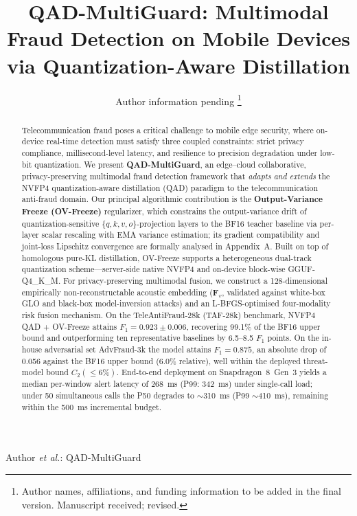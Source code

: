 \documentclass[lettersize,journal]{IEEEtran}
\begin{document}
\title{QAD-MultiGuard: Multimodal Fraud Detection on Mobile Devices\\
via Quantization-Aware Distillation}

\author{%
  Author information pending%
  \thanks{Author names, affiliations, and funding information to be
    added in the final version.  Manuscript received; revised.}%
}

%
{Author \MakeLowercase{\textit{et al.}}: QAD-MultiGuard}

\maketitle

\begin{abstract}
Telecommunication fraud poses a critical challenge to mobile edge
security, where on-device real-time detection must satisfy three
coupled constraints: strict privacy compliance, millisecond-level
latency, and resilience to precision degradation under low-bit
quantization.  We present \textbf{QAD-MultiGuard}, an edge--cloud
collaborative, privacy-preserving multimodal fraud detection
framework that \emph{adapts and extends} the NVFP4 quantization-aware
distillation (QAD) paradigm to the telecommunication anti-fraud
domain.  Our principal algorithmic contribution is the
\textbf{Output-Variance Freeze (OV-Freeze)} regularizer, which
constrains the output-variance drift of quantization-sensitive
$\{q,k,v,o\}$-projection layers to the BF16 teacher baseline via
per-layer scalar rescaling with EMA variance estimation; its gradient
compatibility and joint-loss Lipschitz convergence are formally
analysed in Appendix~A.  Built on top of homologous pure-KL
distillation, OV-Freeze supports a heterogeneous dual-track
quantization scheme---server-side native NVFP4 and on-device
block-wise GGUF-Q4\_K\_M.  For privacy-preserving multimodal fusion,
we construct a 128-dimensional empirically non-reconstructable
acoustic embedding ($\bm{F}_v$, validated against white-box GLO and
black-box model-inversion attacks) and an L-BFGS-optimised
four-modality risk fusion mechanism.  On the TeleAntiFraud-28k
(TAF-28k) benchmark, NVFP4 QAD + OV-Freeze attains $F_1 = 0.923
\pm 0.006$, recovering 99.1\% of the BF16 upper bound and
outperforming ten representative baselines by 6.5--8.5 $F_1$ points.
On the in-house adversarial set AdvFraud-3k the model attains $F_1 =
0.875$, an absolute drop of 0.056 against the BF16 upper bound
(6.0\% relative), well within the deployed threat-model bound
$C_2(\le 6\%)$.  End-to-end deployment on Snapdragon~8~Gen~3 yields
a median per-window alert latency of 268~ms (P99: 342~ms) under
single-call load; under 50 simultaneous calls the P50 degrades to
$\sim$310~ms (P99 $\sim$410~ms), remaining within the 500~ms
incremental budget.
\end{abstract}
\end{document}
